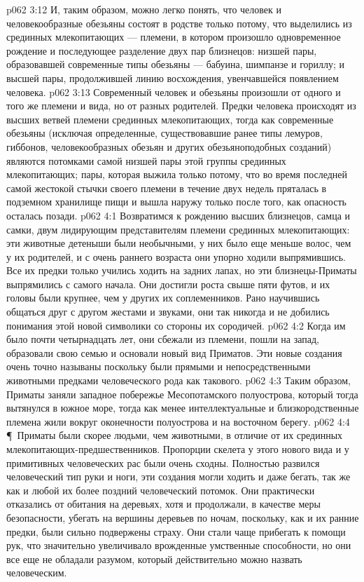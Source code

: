 \vs p062 3:12 И, таким образом, можно легко понять, что человек и человекообразные обезьяны состоят в родстве только потому, что выделились из срединных млекопитающих --- племени, в котором произошло одновременное рождение и последующее разделение двух пар близнецов: низшей пары, образовавшей современные типы обезьяны --- бабуина, шимпанзе и гориллу; и высшей пары, продолжившей линию восхождения, увенчавшейся появлением человека.
\vs p062 3:13 Современный человек и обезьяны произошли от одного и того же племени и вида, но от разных родителей. Предки человека происходят из высших ветвей племени срединных млекопитающих, тогда как современные обезьяны (исключая определенные, существовавшие ранее типы лемуров, гиббонов, человекообразных обезьян и других обезьяноподобных созданий) являются потомками самой низшей пары этой группы срединных млекопитающих; пары, которая выжила только потому, что во время последней самой жестокой стычки своего племени в течение двух недель пряталась в подземном хранилище пищи и вышла наружу только после того, как опасность осталась позади.
\vs p062 4:1 Возвратимся к рождению высших близнецов, самца и самки, двум лидирующим представителям племени срединных млекопитающих: эти животные детеныши были необычными, у них было еще меньше волос, чем у их родителей, и с очень раннего возраста они упорно ходили выпрямившись. Все их предки только учились ходить на задних лапах, но эти близнецы\hyp{}Приматы выпрямились с самого начала. Они достигли роста свыше пяти футов, и их головы были крупнее, чем у других их соплеменников. Рано научившись общаться друг с другом жестами и звуками, они так никогда и не добились понимания этой новой символики со стороны их сородичей.
\vs p062 4:2 Когда им было почти четырнадцать лет, они сбежали из племени, пошли на запад, образовали свою семью и основали новый вид Приматов. Эти новые создания очень точно называны  поскольку были прямыми и непосредственными животными предками человеческого рода как такового.
\vs p062 4:3 Таким образом, Приматы заняли западное побережье Месопотамского полуострова, который тогда вытянулся в южное море, тогда как менее интеллектуальные и близкородственные племена жили вокруг оконечности полуострова и на восточном берегу.
\vs p062 4:4 \P\ Приматы были скорее людьми, чем животными, в отличие от их срединных млекопитающих\hyp{}предшественников. Пропорции скелета у этого нового вида и у примитивных человеческих рас были очень сходны. Полностью развился человеческий тип руки и ноги, эти создания могли ходить и даже бегать, так же как и любой их более поздний человеческий потомок. Они практически отказались от обитания на деревьях, хотя и продолжали, в качестве меры безопасности, убегать на вершины деревьев по ночам, поскольку, как и их ранние предки, были сильно подвержены страху. Они стали чаще прибегать к помощи рук, что значительно увеличивало врожденные умственные способности, но они все еще не обладали разумом, который действительно можно назвать человеческим.
